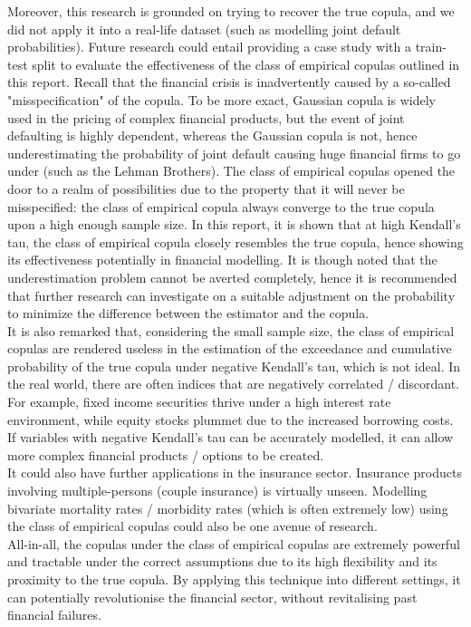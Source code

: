 \documentclass[12pt]{report}
\newcommand{\1}{\mathbf{1}}
\begin{document}
\begin{flushleft}
\vspace{0.5cm}
Moreover, this research is grounded on trying to recover the true copula, and we did not apply it into a real-life dataset (such as modelling joint default probabilities). Future research could entail providing a case study with a train-test split to evaluate the effectiveness of the class of empirical copulas outlined in this report. Recall that the financial crisis is inadvertently caused by a so-called "misspecification" of the copula. To be more exact, Gaussian copula is widely used in the pricing of complex financial products, but the event of joint defaulting is highly dependent, whereas the Gaussian copula is not, hence underestimating the probability of joint default causing huge financial firms to go under (such as the Lehman Brothers). The class of empirical copulas opened the door to a realm of possibilities due to the property that it will never be misspecified: the class of empirical copula always converge to the true copula upon a high enough sample size. In this report, it is shown that at high Kendall's tau, the class of empirical copula closely resembles the true copula, hence showing its effectiveness potentially in financial modelling. It is though noted that the underestimation problem cannot be averted completely, hence it is recommended that further research can investigate on a suitable adjustment on the probability to minimize the difference between the estimator and the copula.\\
\vspace{0.5cm}
It is also remarked that, considering the small sample size, the class of empirical copulas are rendered useless in the estimation of the exceedance and cumulative probability of the true copula under negative Kendall's tau, which is not ideal. In the real world, there are often indices that are negatively correlated / discordant. For example, fixed income securities thrive under a high interest rate environment, while equity stocks plummet due to the increased borrowing costs. If variables with negative Kendall's tau can be accurately modelled, it can allow more complex financial products / options to be created.\\
\vspace{0.5cm}
It could also have further applications in the insurance sector. Insurance products involving multiple-persons (couple insurance) is virtually unseen. Modelling bivariate mortality rates / morbidity rates (which is often extremely low) using the class of empirical copulas could also be one avenue of research.\\
\vspace{0.5cm}
All-in-all, the copulas under the class of empirical copulas are extremely powerful and tractable under the correct assumptions due to its high flexibility and its proximity to the true copula. By applying this technique into different settings, it can potentially revolutionise the financial sector, without revitalising past financial failures.



\end{flushleft}
 
\medskip

\printbibliography
\end{document}
